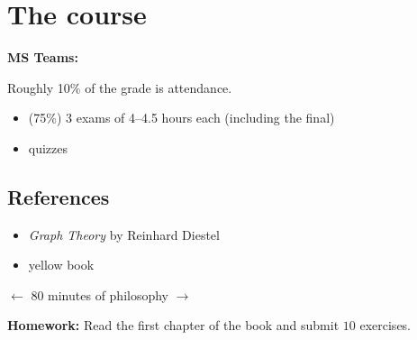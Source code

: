\chapter*{The course} \label{chp:course}

\textbf{MS Teams:} %

Roughly 10\% of the grade is attendance.
\begin{itemize}
    \item (75\%) 3 exams of 4--4.5 hours each (including the final)
    \item quizzes
\end{itemize}

\section*{References} \label{sec:references}
\begin{itemize}
    \item \textit{Graph Theory} by Reinhard Diestel
    \item yellow book
\end{itemize}

\hfill$\longleftarrow$ 80 minutes of philosophy $\longrightarrow$\hfill

\textbf{Homework:} Read the first chapter of the book and submit $10$
exercises.
